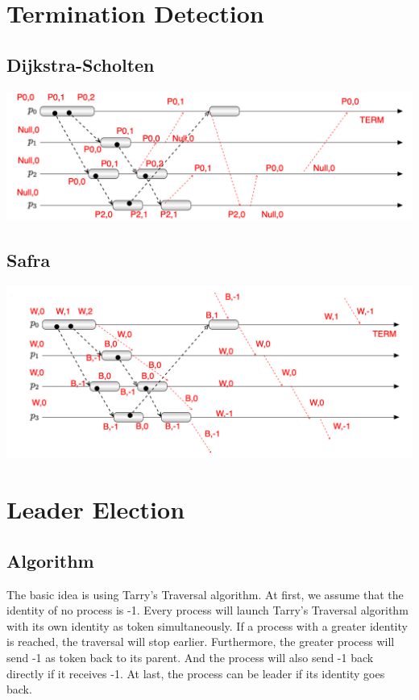 \documentclass{article}
\begin{document}
\section{Termination Detection}
\subsection{Dijkstra-Scholten}
\includegraphics[width=\textwidth]{p1}
\subsection{Safra}
\includegraphics[width=\textwidth]{p2}

\section{Leader Election}

\subsection{Algorithm}

The basic idea is using Tarry's Traversal algorithm.
At first, we assume that the identity of no process is -1.
Every process will launch Tarry's Traversal algorithm with its own identity as token simultaneously.
If a process with a greater identity is reached, the traversal will stop earlier.
Furthermore, the greater process will send -1 as token back to its parent.
And the process will also send -1 back directly if it receives -1.
At last, the process can be leader if its identity goes back.
\end{document}
